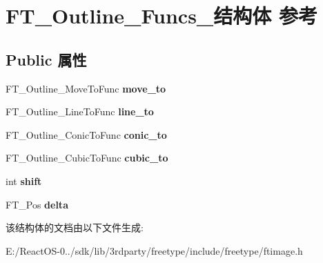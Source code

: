 \hypertarget{struct_f_t___outline___funcs__}{}\section{F\+T\+\_\+\+Outline\+\_\+\+Funcs\+\_\+结构体 参考}
\label{struct_f_t___outline___funcs__}
\subsection*{Public 属性}
\begin{DoxyCompactItemize}
\item 
\mbox{\label{struct_f_t___outline___funcs___abd53463a59a1ae2c6998e619c2ab6a65}} 
F\+T\+\_\+\+Outline\+\_\+\+Move\+To\+Func {\bfseries move\+\_\+to}
\item 
\mbox{\label{struct_f_t___outline___funcs___a876fc8ca7541786cd3c4ec3806f88360}} 
F\+T\+\_\+\+Outline\+\_\+\+Line\+To\+Func {\bfseries line\+\_\+to}
\item 
\mbox{\label{struct_f_t___outline___funcs___a09681f5a64189066d3fba3cf398a135b}} 
F\+T\+\_\+\+Outline\+\_\+\+Conic\+To\+Func {\bfseries conic\+\_\+to}
\item 
\mbox{\label{struct_f_t___outline___funcs___aa3e0c1bacb181a5f43c104ab7f72cfda}} 
F\+T\+\_\+\+Outline\+\_\+\+Cubic\+To\+Func {\bfseries cubic\+\_\+to}
\item 
\mbox{\label{struct_f_t___outline___funcs___a540c246669b21b86cb405b3d9019cfda}} 
int {\bfseries shift}
\item 
\mbox{\label{struct_f_t___outline___funcs___a3c3121398b3ff564b4f3fd5b2a318e5e}} 
F\+T\+\_\+\+Pos {\bfseries delta}
\end{DoxyCompactItemize}


该结构体的文档由以下文件生成\+:\begin{DoxyCompactItemize}
\item 
E\+:/\+React\+O\+S-\/0../sdk/lib/3rdparty/freetype/include/freetype/ftimage.\+h\end{DoxyCompactItemize}
